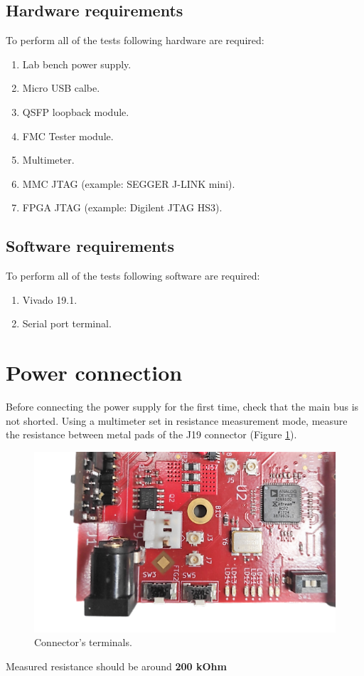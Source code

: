 \documentclass[12pt,oneside,a4]{article}
\begin{document}
\subsection{Hardware requirements}
To perform all of the tests following hardware are required:
\begin{enumerate}
    \item Lab bench power supply.
    \item Micro USB calbe.
    \item QSFP loopback module.
    \item FMC Tester module.
    \item Multimeter.
    \item MMC JTAG (example: SEGGER J-LINK mini).
    \item FPGA JTAG (example: Digilent JTAG HS3).
\end{enumerate}

\subsection{Software requirements}
To perform all of the tests following software are required:
\begin{enumerate}
    \item Vivado 19.1.
    \item Serial port terminal.
\end{enumerate}

\section{Power connection}
Before connecting the power supply for the first time, check that the main bus is not shorted. Using a multimeter set in resistance measurement mode, measure the resistance between metal pads of the J19 connector (Figure \ref{01}).
\begin{figure}[H]
\begin{center}
\includegraphics[width=0.9\linewidth]{J19.png}
 \caption{Connector's terminals. }\label{01}
\end{center}
\end{figure}
\begin{leftbar}
Measured resistance should be around \textbf{{\color{red}200 kOhm}}
\end{leftbar}
\end{document}
